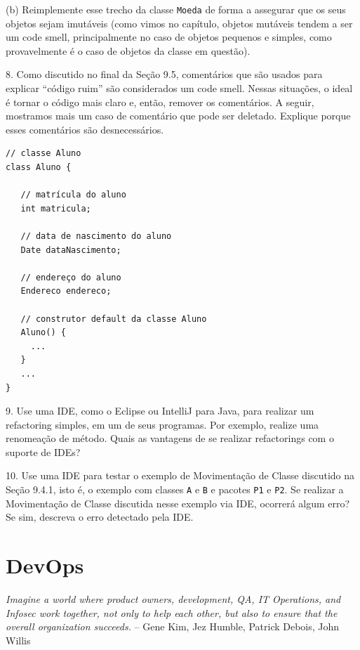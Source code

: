 \documentclass[
  11pt,
  twoside]{book}
\newcommand{\passthrough}[1]{#1}
\renewenvironment{quote}{\centering \vspace{1.5ex} \begin{tcolorbox}[colback=backcolor, width=4.9in]}{\end{tcolorbox}}
\begin{document}
(b) Reimplemente esse trecho da classe \passthrough{\lstinline!Moeda!}
de forma a assegurar que os seus objetos sejam imutáveis (como vimos no
capítulo, objetos mutáveis tendem a ser um code smell, principalmente no
caso de objetos pequenos e simples, como provavelmente é o caso de
objetos da classe em questão).

8. Como discutido no final da Seção 9.5, comentários que são usados para
explicar ``código ruim'' são considerados um code smell. Nessas
situações, o ideal é tornar o código mais claro e, então, remover os
comentários. A seguir, mostramos mais um caso de comentário que pode ser
deletado. Explique porque esses comentários são desnecessários.

\begin{lstlisting}
// classe Aluno
class Aluno {
   
   // matrícula do aluno
   int matricula;
   
   // data de nascimento do aluno
   Date dataNascimento;
   
   // endereço do aluno
   Endereco endereco;
   
   // construtor default da classe Aluno
   Aluno() {
     ...
   } 
   ...  
}
\end{lstlisting}

9. Use uma IDE, como o Eclipse ou IntelliJ para Java, para realizar um
refactoring simples, em um de seus programas. Por exemplo, realize uma
renomeação de método. Quais as vantagens de se realizar refactorings com
o suporte de IDEs?

10. Use uma IDE para testar o exemplo de Movimentação de Classe
discutido na Seção 9.4.1, isto é, o exemplo com classes
\passthrough{\lstinline!A!} e \passthrough{\lstinline!B!} e pacotes
\passthrough{\lstinline!P1!} e \passthrough{\lstinline!P2!}. Se realizar
a Movimentação de Classe discutida nesse exemplo via IDE, ocorrerá algum
erro? Se sim, descreva o erro detectado pela IDE.

\hypertarget{devops}{%
\chapter{DevOps}\label{devops}}

\begin{quote}
\emph{Imagine a world where product owners, development, QA, IT
Operations, and Infosec work together, not only to help each other, but
also to ensure that the overall organization succeeds.} -- Gene Kim, Jez
Humble, Patrick Debois, John Willis
\end{quote}
\end{document}
